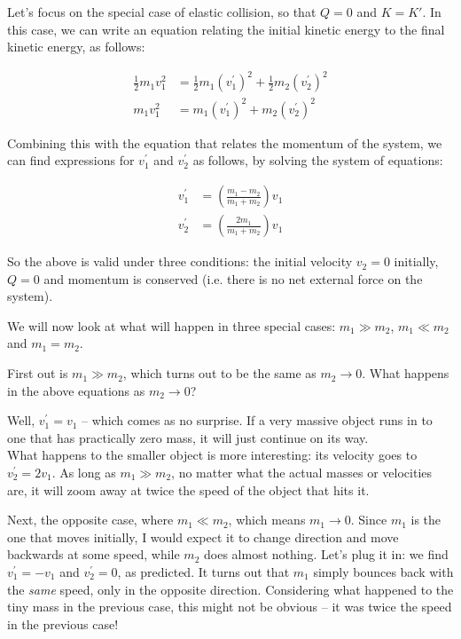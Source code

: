 Let's focus on the special case of elastic collision, so that $Q = 0$ and $K = K'$. In this case, we can write an equation relating the initial kinetic energy to the final kinetic energy, as follows:

\begin{align}
\frac{1}{2} m_1 v_1^2 &= \frac{1}{2} m_1 (v_1^{'})^2 + \frac{1}{2} m_2 (v_2^{'})^2\\
m_1 v_1^2 &= m_1 (v_1^{'})^2 + m_2 (v_2^{'})^2
\end{align}

Combining this with the equation that relates the momentum of the system, we can find expressions for $v_1^{'}$ and $v_2^{'}$ as follows, by solving the system of equations:

\begin{align}
v_1^{'} &= \left(\frac{m_1 - m_2}{m_1 + m_2}\right) v_1\\
v_2^{'} &= \left(\frac{2 m_1}{m_1 + m_2}\right) v_1
\end{align}

So the above is valid under three conditions: the initial velocity $v_2 = 0$ initially, $Q = 0$ and momentum is conserved (i.e. there is no net external force on the system).

We will now look at what will happen in three special cases: $m_1 \gg m_2$, $m_1 \ll m_2$ and $m_1 = m_2$.

First out is $m_1 \gg m_2$, which turns out to be the same as $m_2 \to 0$. What happens in the above equations as $m_2 \to 0$?

Well, $v_1^{'} = v_1$ -- which comes as no surprise. If a very massive object runs in to one that has practically zero mass, it will just continue on its way.\\
What happens to the smaller object is more interesting: its velocity goes to $v_2^{'} = 2 v_1$. As long as $m_1 \gg m_2$, no matter what the actual masses or velocities are, it will zoom away at twice the speed of the object that hits it.

Next, the opposite case, where $m_1 \ll m_2$, which means $m_1 \to 0$. Since $m_1$ is the one that moves initially, I would expect it to change direction and move backwards at some speed, while $m_2$ does almost nothing. Let's plug it in: we find $v_1^{'} = -v_1$ and $v_2^{'} = 0$, as predicted. It turns out that $m_1$ simply bounces back with the \emph{same} speed, only in the opposite direction. Considering what happened to the tiny mass in the previous case, this might not be obvious -- it was twice the speed in the previous case!


